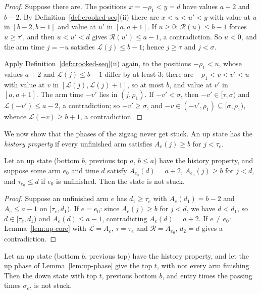 \begin{proof}
Suppose there are. The positions $x=-\rho_1<y=d$ have values $a+2$ and $b-2$. By Definition~\ref{def:crooked-seq}(ii) there are
$x<u<u'<y$ with value at $u$ in $[b-2,b-1]$ and value at $u'$ in $[a,a+1]$. If $u\ge0$: $\mathcal R(u)\le b-1$ forces $u\ge\tau'$, and
then $u<u'<d$ gives $\mathcal R(u')\le a-1$, a contradiction. So $u<0$, and the arm time $j=-u$ satisfies $\mathcal L(j)\le b-1$; hence
$j\ge\tau$ and $j<\sigma$.

Apply Definition~\ref{def:crooked-seq}(ii) again, to the positions $-\rho_1<u$, whose values $a+2$ and $\mathcal L(j)\le b-1$ differ by at
least $3$: there are $-\rho_1<v<v'<u$ with value at $v$ in $[\mathcal L(j),\mathcal L(j)+1]$, so at most $b$, and value at $v'$ in
$[a,a+1]$. The arm time $-v'$ lies in $(j,\rho_1)$. If $-v'<\sigma$, then $-v'\in[\tau,\sigma)$ and $\mathcal L(-v')\le a-2$, a
contradiction; so $-v'\ge\sigma$, and $-v\in(-v',\rho_1)\subseteq[\sigma,\rho_1)$, whence $\mathcal L(-v)\ge b+1$, a contradiction.
\end{proof}


We now show that the phases of the zigzag never get stuck. An up state has the \emph{history property} if every unfinished arm
satisfies $A_e(j)\ge b$ for $j<\tau_e$.

\begin{lemma}\label{lem:nofail-up}
Let an up state (bottom $b$, previous top $a$, $b\le a$) have the history property, and suppose some arm $e_0$ and time $d$ satisfy
$A_{e_0}(d)=a+2$, $A_{e_0}(j)\ge b$ for $j<d$, and $\tau_{e_0}\le d$ if $e_0$ is unfinished. Then the state is not stuck.
\end{lemma}

\begin{proof}
Suppose an unfinished arm $e$ has $d_1\ge\tau_e$ with $A_e(d_1)=b-2$ and $A_e\le a-1$ on $[\tau_e,d_1)$. If $e=e_0$: since
$A_e(j)\ge b$ for $j<d$, we have $d<d_1$, so $d\in[\tau_e,d_1)$ and $A_e(d)\le a-1$, contradicting $A_e(d)=a+2$. If $e\ne e_0$:
Lemma~\ref{lem:up-core} with $\mathcal L=A_e$, $\tau=\tau_e$ and $\mathcal R=A_{e_0}$, $d_2=d$ gives a contradiction.
\end{proof}


\begin{lemma}\label{lem:nofail-down}
Let an up state (bottom $b$, previous top) have the history property, and let the up phase of Lemma~\ref{lem:up-phase} give the top
$t$, with not every arm finishing. Then the down state with top $t$, previous bottom $b$, and entry times the passing times $\sigma_e$,
is not stuck.
\end{lemma}

